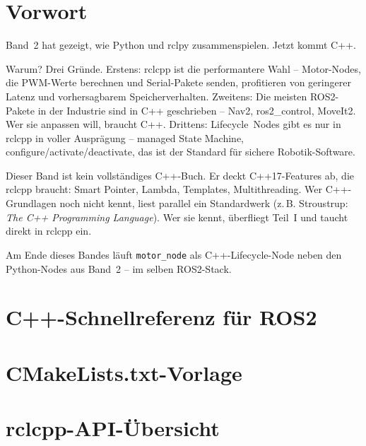 \documentclass[12pt,a5paper]{book}
\newcommand{\BandVorwort}{%
Band~2 hat gezeigt, wie Python und rclpy zusammenspielen.
Jetzt kommt C++.

Warum? Drei Gründe.
Erstens: rclcpp ist die performantere Wahl -- Motor-Nodes,
die PWM-Werte berechnen und Serial-Pakete senden,
profitieren von geringerer Latenz und vorhersagbarem Speicherverhalten.
Zweitens: Die meisten ROS2-Pakete in der Industrie sind in C++ geschrieben --
Nav2, ros2\_control, MoveIt2. Wer sie anpassen will, braucht C++.
Drittens: Lifecycle~Nodes gibt es nur in rclcpp in voller Ausprägung --
managed State Machine, configure/activate/deactivate,
das ist der Standard für sichere Robotik-Software.

Dieser Band ist kein vollständiges C++-Buch.
Er deckt C++17-Features ab, die rclcpp braucht:
Smart Pointer, Lambda, Templates, Multithreading.
Wer C++-Grundlagen noch nicht kennt, liest parallel ein Standardwerk
(z.\,B. Stroustrup: \textit{The C++ Programming Language}).
Wer sie kennt, überfliegt Teil~I und taucht direkt in rclcpp ein.

Am Ende dieses Bandes läuft \texttt{motor\_node} als C++-Lifecycle-Node
neben den Python-Nodes aus Band~2 -- im selben ROS2-Stack.
}
\begin{document}


\frontmatter
\chapter*{Vorwort}
\BandVorwort
\newpage

\tableofcontents

\mainmatter






\backmatter
\appendix
\chapter{C++-Schnellreferenz für ROS2}
\label{app:quickref}

\chapter{CMakeLists.txt-Vorlage}
\label{app:cmake}

\chapter{rclcpp-API-Übersicht}
\label{app:rclcpp}
\end{document}
